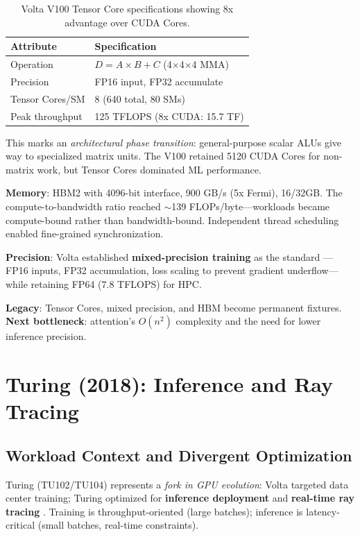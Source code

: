 \documentclass{article}
\begin{document}
\begin{table}[h]
\centering
\footnotesize
\begin{tabular}{ll}
\toprule
Attribute & Specification \\
\midrule
Operation & $D = A \times B + C$ (4$\times$4$\times$4 MMA) \\
Precision & FP16 input, FP32 accumulate \\
Tensor Cores/SM & 8 (640 total, 80 SMs) \\
Peak throughput & 125 TFLOPS (8x CUDA: 15.7 TF) \\
\bottomrule
\end{tabular}
\caption{Volta V100 Tensor Core specifications showing 8x advantage over CUDA Cores.}
\end{table}

This marks an \textit{architectural phase transition}: general-purpose scalar ALUs give way to specialized matrix units. The V100 retained 5120 CUDA Cores for non-matrix work, but Tensor Cores dominated ML performance.

\textbf{Memory}: HBM2 with 4096-bit interface, 900 GB/s (5x Fermi), 16/32GB. The compute-to-bandwidth ratio reached $\sim$139 FLOPs/byte---workloads became compute-bound rather than bandwidth-bound. Independent thread scheduling enabled fine-grained synchronization.

\textbf{Precision}: Volta established \textbf{mixed-precision training} as the standard \cite{micikevicius2017mixed}---FP16 inputs, FP32 accumulation, loss scaling to prevent gradient underflow---while retaining FP64 (7.8 TFLOPS) for HPC.

\textbf{Legacy}: Tensor Cores, mixed precision, and HBM become permanent fixtures. \textbf{Next bottleneck}: attention's $O(n^2)$ complexity and the need for lower inference precision.

\section{Turing (2018): Inference and Ray Tracing}

\subsection{Workload Context and Divergent Optimization}

Turing (TU102/TU104) represents a \textit{fork in GPU evolution}: Volta targeted data center training; Turing optimized for \textbf{inference deployment} and \textbf{real-time ray tracing} \cite{nvidia2018turing}. Training is throughput-oriented (large batches); inference is latency-critical (small batches, real-time constraints).
\end{document}
